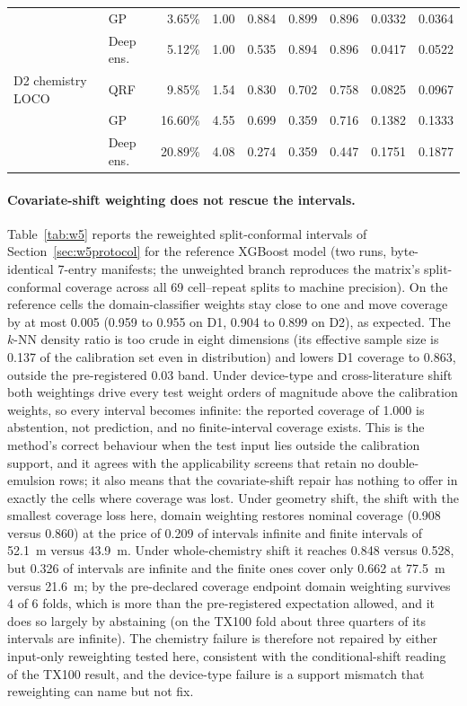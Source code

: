 \documentclass[11pt,a4paper]{article}
\newcommand{\um}{\textmu m}
\newcommand{\tox}{TX100}
\begin{document}
\begin{table}[t]
{\begin{tabular}{llrrrrrrr}
 & GP & 3.65\% & 1.00 & 0.884 & 0.899 & 0.896 & 0.0332 & 0.0364 \\
 & Deep ens. & 5.12\% & 1.00 & 0.535 & 0.894 & 0.896 & 0.0417 & 0.0522 \\
D2 chemistry LOCO & QRF & 9.85\% & 1.54 & 0.830 & 0.702 & 0.758 & 0.0825 & 0.0967 \\
 & GP & 16.60\% & 4.55 & 0.699 & 0.359 & 0.716 & 0.1382 & 0.1333 \\
 & Deep ens. & 20.89\% & 4.08 & 0.274 & 0.359 & 0.447 & 0.1751 & 0.1877 \\
\bottomrule
\end{tabular}}
\end{table}

\paragraph{Covariate-shift weighting does not rescue the intervals.}
Table~\ref{tab:w5} reports the reweighted split-conformal intervals of
Section~\ref{sec:w5protocol} for the reference XGBoost model (two runs,
byte-identical 7-entry manifests; the unweighted branch reproduces the matrix's split-conformal coverage across all 69 cell--repeat splits to machine precision). On
the reference cells the domain-classifier weights stay close to one and move
coverage by at most 0.005 (0.959 to 0.955 on D1, 0.904 to 0.899 on D2), as
expected. The $k$-NN density ratio is too crude in eight dimensions (its
effective sample size is 0.137 of the calibration set even in
distribution) and lowers D1 coverage to 0.863, outside the pre-registered
0.03 band. Under device-type and cross-literature shift both weightings drive
every test weight orders of magnitude above the calibration weights, so every
interval becomes infinite: the reported coverage of 1.000 is abstention, not
prediction, and no finite-interval coverage exists. This is the method's
correct behaviour when the test input lies outside the calibration support,
and it agrees with the applicability screens that retain no double-emulsion
rows; it also means that the covariate-shift repair has nothing to offer in
exactly the cells where coverage was lost. Under geometry shift, the shift with the
smallest coverage loss here, domain weighting restores nominal coverage (0.908 versus 0.860)
at the price of 0.209 of intervals infinite and finite intervals of
52.1~\um{} versus 43.9~\um. Under whole-chemistry shift it reaches 0.848 versus 0.528, but 0.326 of intervals are infinite and the finite ones cover
only 0.662 at 77.5~\um{} versus 21.6~\um; by the pre-declared coverage
endpoint domain weighting survives 4 of 6 folds, which is more than the
pre-registered expectation allowed, and it does so largely by abstaining (on
the \tox{} fold about three quarters of its intervals are infinite). The
chemistry failure is therefore not repaired by either input-only reweighting tested here,
consistent with the conditional-shift reading of the \tox{} result, and the
device-type failure is a support mismatch that reweighting can name but not
fix.
\end{document}

